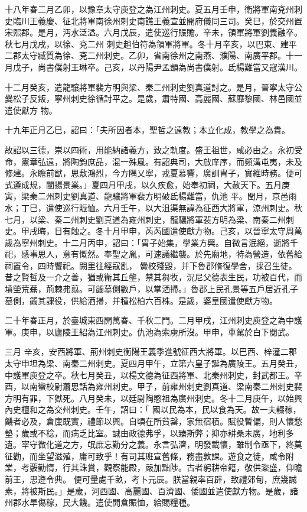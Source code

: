 \begin{pinyinscope}
 十八年春二月乙卯，以豫章太守庾登之為江州刺史。夏五月壬申，衛將軍南兗州刺史臨川王義慶、征北將軍南徐州刺史南譙王義宣並開府儀同三司。癸巳，於交州置宋熙郡。是月，沔水泛溢。六月戊辰，遣使巡行賑贍。辛未，領軍將軍劉義融卒。秋七月戊戌，以徐、兗二州
 刺史趙伯符為領軍將軍。冬十月辛亥，以巴東、建平二郡太守臧質為徐、兗二州刺史。乙卯，省南徐州之南燕、濮陽、南廣平郡。十一月戊子，尚書僕射王琳卒。己亥，以丹陽尹孟顗為尚書僕射。氐楊難當又寇漢川。



 十二月癸亥，遣龍驤將軍裴方明與梁、秦二州刺史劉真道討之。是月，晉寧太守公爨松子反叛，寧州刺史徐循討平之。是歲，肅特國、高麗國、蘇靡黎國、林邑國並遣使獻方
 物。



 十九年正月乙巳，詔曰：「夫所因者本，聖哲之遠教；本立化成，教學之為貴。



 故詔以三德，崇以四術，用能納諸義方，致之軌度。盛王祖世，咸必由之。永初受命，憲章弘遠，將陶鈞庶品，混一殊風。有詔典司，大啟庠序，而頻溝屯夷，未及修建。永瞻前猷，思敷鴻烈，今方隅乂寧，戎夏慕響，廣訓胄子，實維時務。便可式遵成規，闡揚景業。」夏四月甲戌，以久疾愈，始奉初祠，大赦天下。五月庚寅，梁秦二州刺史劉真道、龍驤將軍裴方明破氐楊難當，仇池
 平。閏月，京邑雨水；丁巳，遣使巡行賑恤。六月壬午，以大沮渠無諱為征西大將軍，涼州刺史。秋七月，以梁、秦二州刺史劉真道為雍州刺史，龍驤將軍裴方明為梁、南秦二州刺史。甲戌晦，日有蝕之。冬十月甲申，芮芮國遣使獻方物。己亥，以晉寧太守周萬歲為寧州刺史。十二月丙申，詔曰：「胄子始集，學業方興。自微言泯絕，逝將千祀，感事思人，意有慨然。奉聖之胤，可速議繼襲。於先廟地，特為營造，依舊給祠置令，四時饗祀。闕里往經寇亂，
 黌校殘毀，并下魯郡脩復學舍，採召生徒。昔之賢哲及一介之善，猶或衛其丘壟，禁其芻牧，況尼父德表生民，功被百代，而墳塋荒蕪，荊棘弗翦。可蠲墓側數戶，以掌洒掃。」魯郡上民孔景等五戶居近孔子墓側，蠲其課役，供給洒掃，并種松柏六百株。是歲，婆皇國遣使獻方物。



 二十年春正月，於臺城東西開萬春、千秋二門。二月甲戌，江州刺史庾登之為中護軍。庚申，以廬陵王紹為江州刺史。仇池為索虜所沒。甲申，車駕於白下閱武。



 三月
 辛亥，安西將軍、荊州刺史衡陽王義季進號征西大將軍。以巴西、梓潼二郡太守申坦為梁、南秦二州刺史。夏四月甲午，立第六皇子誕為廣陵王。五月癸丑，中護軍庾登之卒。秋七月癸丑，以楊文德為征西將軍、北秦州刺史，封武都王。辛酉，以南蠻校尉蕭思話為雍州刺史。甲子，前雍州刺史劉真道、梁南秦二州刺史裴方明有罪，下獄死。八月癸未，以廷尉陶愍祖為廣州刺史。冬十二月庚午，以始興內史檀和之為交州刺史。壬午，詔曰：「
 國以民為本，民以食為天。故一夫輟稼，饑者必及，倉廩既實，禮節以興。自頃在所貧罄，家無宿積。賦役暫偏，則人懷愁墊；歲或不稔，而病乏比室。誠由政德弗孚，以臻斯弊；抑亦耕桑未廣，地利多遺。宰守微化道之方，氓庶忘勤分之義。永言弘濟，明發載懷，雖制令亟下，終莫征勸，而坐望滋殖，庸可致乎！有司其班宣舊條，務盡敦課。遊食之徒，咸令附業，考覈勤惰，行其誅賞，觀察能殿，嚴加黜陟。古者躬耕帝籍，敬供粢盛，仰瞻前王，思遵令典。
 便可量處千畝，考卜元辰。朕當親率百辟，致禮郊甸，庶幾誠素，將被斯民。」是歲，河西國、高麗國、百濟國、倭國並遣使獻方物。是歲，諸州郡水旱傷稼，民大饑。遣使開倉賑恤，給賜糧種。




\end{pinyinscope}
